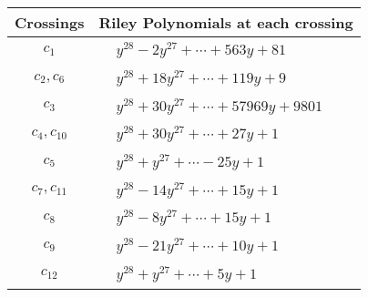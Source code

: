 \documentclass[1p]{elsarticle_modified}
\theoremstyle{definition}
\begin{document}
\begin{tabular}{m{50pt}|m{274pt}}
Crossings & \hspace{64pt}Riley Polynomials at each crossing \\
\hline $$\begin{aligned}c_{1}\end{aligned}$$&$\begin{aligned}
&y^{28}-2 y^{27}+\cdots+563 y+81
\end{aligned}$\\
\hline $$\begin{aligned}c_{2},c_{6}\end{aligned}$$&$\begin{aligned}
&y^{28}+18 y^{27}+\cdots+119 y+9
\end{aligned}$\\
\hline $$\begin{aligned}c_{3}\end{aligned}$$&$\begin{aligned}
&y^{28}+30 y^{27}+\cdots+57969 y+9801
\end{aligned}$\\
\hline $$\begin{aligned}c_{4},c_{10}\end{aligned}$$&$\begin{aligned}
&y^{28}+30 y^{27}+\cdots+27 y+1
\end{aligned}$\\
\hline $$\begin{aligned}c_{5}\end{aligned}$$&$\begin{aligned}
&y^{28}+y^{27}+\cdots-25 y+1
\end{aligned}$\\
\hline $$\begin{aligned}c_{7},c_{11}\end{aligned}$$&$\begin{aligned}
&y^{28}-14 y^{27}+\cdots+15 y+1
\end{aligned}$\\
\hline $$\begin{aligned}c_{8}\end{aligned}$$&$\begin{aligned}
&y^{28}-8 y^{27}+\cdots+15 y+1
\end{aligned}$\\
\hline $$\begin{aligned}c_{9}\end{aligned}$$&$\begin{aligned}
&y^{28}-21 y^{27}+\cdots+10 y+1
\end{aligned}$\\
\hline $$\begin{aligned}c_{12}\end{aligned}$$&$\begin{aligned}
&y^{28}+y^{27}+\cdots+5 y+1
\end{aligned}$\\
\hline
\end{tabular}\\~\\
\end{document}
